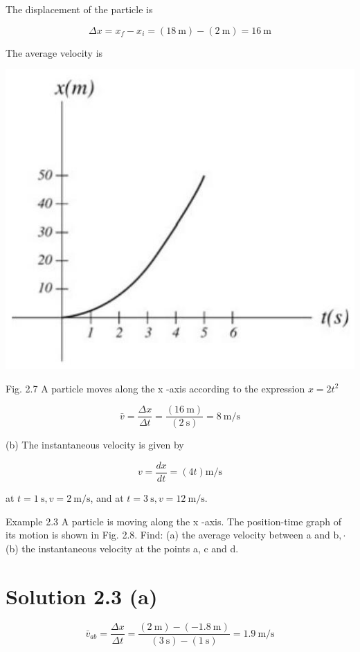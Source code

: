 \documentclass[10pt]{article}
\begin{document}
The displacement of the particle is

$$
\Delta x=x_{f}-x_{i}=(18 \mathrm{~m})-(2 \mathrm{~m})=16 \mathrm{~m}
$$

The average velocity is

\begin{center}
\includegraphics[max width=\textwidth]{2024_09_13_db1f357d2aad0a03eb2eg-029(3)}
\end{center}

Fig. 2.7 A particle moves along the x -axis according to the expression $x=2 t^{2}$

$$
\bar{v}=\frac{\Delta x}{\Delta t}=\frac{(16 \mathrm{~m})}{(2 \mathrm{~s})}=8 \mathrm{~m} / \mathrm{s}
$$

(b) The instantaneous velocity is given by

$$
v=\frac{d x}{d t}=(4 t) \mathrm{m} / \mathrm{s}
$$

at $t=1 \mathrm{~s}, v=2 \mathrm{~m} / \mathrm{s}$, and at $t=3 \mathrm{~s}, v=12 \mathrm{~m} / \mathrm{s}$.

Example 2.3 A particle is moving along the x -axis. The position-time graph of its motion is shown in Fig. 2.8. Find: (a) the average velocity between a and $\mathrm{b}, \cdot$ (b) the instantaneous velocity at the points a, c and d.

\section*{Solution 2.3 (a)}
$$
\bar{v}_{a b}=\frac{\Delta x}{\Delta t}=\frac{(2 \mathrm{~m})-(-1.8 \mathrm{~m})}{(3 \mathrm{~s})-(1 \mathrm{~s})}=1.9 \mathrm{~m} / \mathrm{s}
$$
\end{document}
